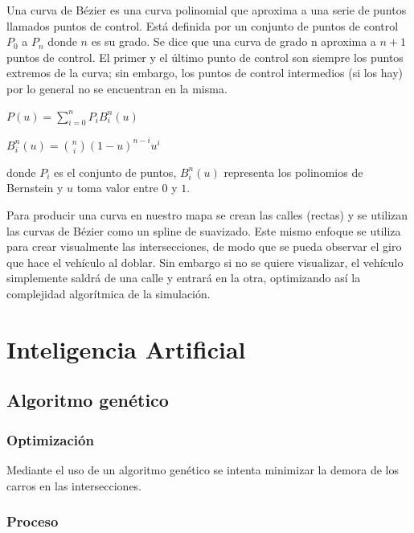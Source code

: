 \documentclass[colorinlistoftodos,twoside,twocolumn]{article} %
\begin{document}
	Una curva de Bézier es una curva polinomial que aproxima a una serie de puntos llamados puntos de control. Est\'a definida por un conjunto de puntos de control $ P_{0} $ a $ P_{n} $ donde $ n $ es su grado. Se dice que una curva de grado n aproxima a $ n + 1 $ puntos de control. El primer y el último punto de control son siempre los puntos extremos de la curva; sin embargo, los puntos de control intermedios (si los hay) por lo general no se encuentran en la misma. 
	
	\begin{center}
		$ P(u) = \sum_{i=0}^{n} P_{i}B_{i}^{n}(u) $
	\end{center}
	\begin{center}
		$ B_{i}^{n}(u) = \binom{n}{i} (1 - u)^{n-i}u^{i} $
	\end{center}
	donde $ P_{i} $ es el conjunto de puntos, $ B_{i}^{n}(u) $ representa los polinomios de Bernstein y $ u $ toma valor entre $ 0 $ y $ 1 $.

	Para producir una curva en nuestro mapa se crean las calles (rectas) y se utilizan las curvas de B\'ezier como un spline de suavizado. Este mismo enfoque se utiliza para crear visualmente las intersecciones, de modo que se pueda observar el giro que hace el veh\'iculo al doblar. Sin embargo si no se quiere visualizar, el veh\'iculo simplemente saldr\'a de una calle y entrar\'a en la otra, optimizando as\'i la complejidad algor\'itmica de la simulaci\'on.
	
	
	\section{Inteligencia Artificial}
	
	\subsection{Algoritmo genético}
	
	\subsubsection{Optimizaci\'on}
	
	Mediante el uso de un algoritmo gen\'etico se intenta minimizar la demora de los carros en las intersecciones. 
	
	\subsubsection{Proceso}
	
\end{document}
